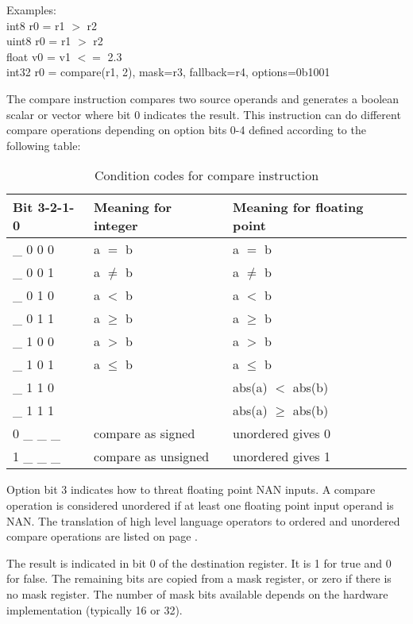 \documentclass[forwardcom.tex]{subfiles}
\begin{document}
Examples:\\
int8 r0 = r1 $>$ r2 \\
uint8 r0 = r1 $>$ r2 \\
float v0 = v1 $<=$ 2.3 \\
int32 r0 = compare(r1, 2), mask=r3, fallback=r4, options=0b1001
\vv

The compare instruction compares two source operands and generates a boolean scalar or vector where bit 0 indicates the result. This instruction can do different compare operations depending on option bits 0-4 defined according to the following table:

\begin{longtable} {|p{14mm}|p{50mm}|p{50mm}|}
\caption{Condition codes for compare instruction} 
\label{table:conditionCodesForCompareInstruction} \\
\endfirsthead
\endhead
\hline
\bfseries Bit 3-2-1-0 & \bfseries Meaning for integer & \bfseries Meaning for floating point \\
\hline
\_ 0 0 0 & a $=$ b    & a $=$ b \\
\_ 0 0 1 & a $\neq$ b & a $\neq$ b \\
\_ 0 1 0 & a $<$ b    & a $<$ b \\
\_ 0 1 1 & a $\geq$ b & a $\geq$ b \\
\_ 1 0 0 & a $>$ b    & a $>$ b \\
\_ 1 0 1 & a $\leq$ b & a $\leq$ b \\
\_ 1 1 0 &            & abs(a) $<$ abs(b) \\
\_ 1 1 1 &            & abs(a) $\geq$ abs(b) \\
\hline
0 \_ \_ \_ & compare as signed & unordered gives 0 \\
1 \_ \_ \_ & compare as unsigned & unordered gives 1 \\
\hline
\end{longtable}

Option bit 3 indicates how to threat floating point NAN inputs. A compare operation is considered unordered if at least one floating point input operand is NAN. The translation of high level language operators to ordered and unordered compare operations are listed on page \pageref{table:floatCompareJumpInstructions}.
\vv

The result is indicated in bit 0 of the destination register. It is 1 for true and 0 for false. The remaining bits are copied from a mask register, or zero if there is no mask register. The number of mask bits available depends on the hardware implementation (typically 16 or 32).
\vv
\end{document}

